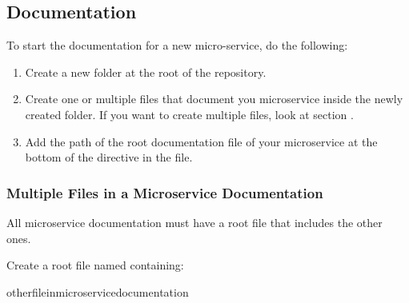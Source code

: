 \documentclass[letterpaper,10pt,english]{sphinxmanual}
\begin{document}
\subsection{ Documentation}
\label{\detokenize{building_a_microservice:general-documentation}}
To start the  documentation for a new micro-service, do the following:
\begin{enumerate}
\def\theenumi{\arabic{enumi}}
\def\labelenumi{\theenumi .}
\makeatletter\def\p@enumii{\p@enumi \theenumi .}\makeatother
\item {} 
Create a new folder  at the root of the repository.

\item {} 
Create one or multiple  files that document you microservice inside the newly created folder.
If you want to create multiple files, look at section {\hyperref[\detokenize{building_a_microservice:multiple-files-in-microservice-documentation}]{}}.

\item {} 
Add the path of the root documentation file of your microservice at the bottom of the  directive in the  file.

\end{enumerate}


\subsubsection{Multiple Files in a Microservice Documentation}
\label{\detokenize{building_a_microservice:multiple-files-in-a-microservice-documentation}}\label{\detokenize{building_a_microservice:multiple-files-in-microservice-documentation}}
All microservice documentation must have a root file that includes the other ones.

Create a root file named  containing:

\begin{sphinxVerbatim}[commandchars=\\\{\}]

 
   
   

  \PYGZlt{}other\PYGZus{}file\PYGZus{}in\PYGZus{}microservice\PYGZus{}documentation\PYGZgt{}
\end{sphinxVerbatim}
\end{document}
